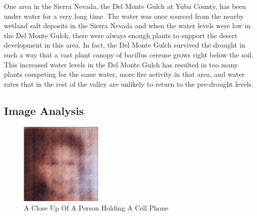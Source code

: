 \documentclass{article}%
\begin{document}
One area in the Sierra Nevada, the Del Monte Gulch at Yuba County, has been under water for a very long time. The water was once sourced from the nearby wetland salt deposits in the Sierra Nevada and when the water levels were low in the Del Monte Gulch, there were always enough plants to support the desert development in this area.\newline%
In fact, the Del Monte Gulch survived the drought in such a way that a vast plant canopy of bacillus cereuse grows right below the soil. This increased water levels in the Del Monte Gulch has resulted in too many plants competing for the same water, more fire activity in that area, and water rates that in the rest of the valley are unlikely to return to the pre{-}drought levels.

%
\subsection{Image Analysis}%
\label{subsec:ImageAnalysis}%


\begin{figure}[h!]%
\centering%
\includegraphics[width=150px]{500_fake_images/samples_5_207.png}%
\caption{A Close Up Of A Person Holding A Cell Phone}%
\end{figure}

%
\end{document}
